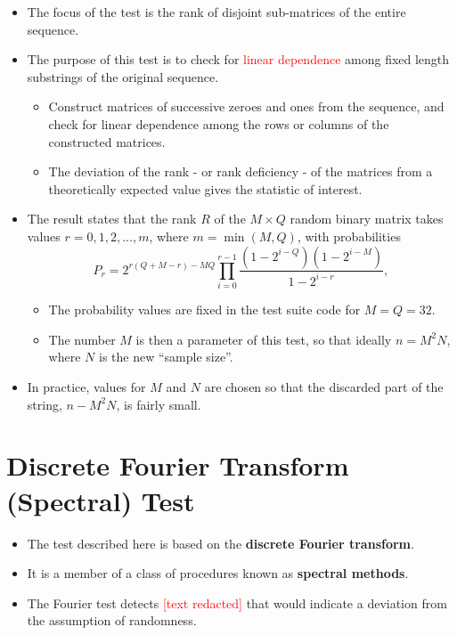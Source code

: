 \documentclass[12pt,openany]{book}
\theoremstyle{definition}
\begin{document}
	\begin{itemize}
		\item The focus of the test is the rank of disjoint sub-matrices of the entire sequence.
		\item The purpose of this test is to check for \textcolor{red}{linear dependence} among fixed length substrings of the original sequence.
		\begin{itemize}
			\item Construct matrices of successive zeroes and ones from the sequence, and check for linear dependence among the rows or columns of the constructed matrices.
			\item The deviation of the rank - or rank deficiency - of the matrices from a theoretically expected value gives the statistic of interest.
		\end{itemize}
		\item The result states that the rank \( R \) of the \( M \times Q \) random binary matrix takes values \( r = 0, 1, 2, ..., m \), where \( m = \min(M, Q) \), with probabilities
		\[
		P_r = 2^{r(Q+M-r)-MQ}\prod_{i=0}^{r-1}\frac{(1-2^{i-Q})(1-2^{i-M})}{1-2^{i-r}},
		\]
		\begin{itemize}
			\item The probability values are fixed in the test suite code for \( M = Q = 32 \).
			\item The number \( M \) is then a parameter of this test, so that ideally \( n = M^2N \), where \( N \) is the new ``sample size''.
		\end{itemize}
		\item In practice, values for \( M \) and \( N \) are chosen so that the discarded part of the string, \( n - M^2N \), is fairly small.
	\end{itemize}
	
	\section*{Discrete Fourier Transform (Spectral) Test}
	
	\begin{itemize}
		\item The test described here is based on the \textbf{discrete Fourier transform}.
		\item It is a member of a class of procedures known as \textbf{spectral methods}.
		\item The Fourier test detects \textcolor{red}{[text redacted]} that would indicate a deviation from the assumption of randomness.
	\end{itemize}
	
\end{document}
